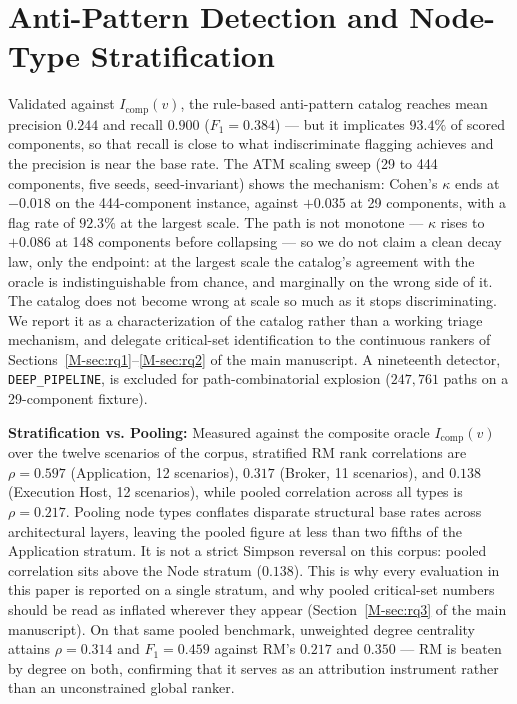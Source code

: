 \documentclass[preprint,3p]{elsarticle}
\begin{document}
\section{Anti-Pattern Detection and Node-Type Stratification}
\label{supp:detection}

Validated against $I_{\text{comp}}(v)$, the rule-based anti-pattern catalog reaches mean precision $0.244$ and recall $0.900$ ($F_1 = 0.384$) --- but it implicates $93.4\%$ of scored components, so that recall is close to what indiscriminate flagging achieves and the precision is near the base rate. The ATM scaling sweep (29 to 444 components, five seeds, seed-invariant) shows the mechanism: Cohen's $\kappa$ ends at $-0.018$ on the 444-component instance, against $+0.035$ at 29 components, with a flag rate of $92.3\%$ at the largest scale. The path is not monotone --- $\kappa$ rises to $+0.086$ at 148 components before collapsing --- so we do not claim a clean decay law, only the endpoint: at the largest scale the catalog's agreement with the oracle is indistinguishable from chance, and marginally on the wrong side of it. The catalog does not become wrong at scale so much as it stops discriminating. We report it as a characterization of the catalog rather than a working triage mechanism, and delegate critical-set identification to the continuous rankers of Sections~\ref{M-sec:rq1}--\ref{M-sec:rq2} of the main manuscript. A nineteenth detector, \texttt{DEEP\_PIPELINE}, is excluded for path-combinatorial explosion ($247{,}761$ paths on a 29-component fixture).

\noindent\textbf{Stratification vs. Pooling:} Measured against the composite oracle $I_{\text{comp}}(v)$ over the twelve scenarios of the corpus, stratified RM rank correlations are $\rho = 0.597$ (Application, 12 scenarios), $0.317$ (Broker, 11 scenarios), and $0.138$ (Execution Host, 12 scenarios), while pooled correlation across all types is $\rho = 0.217$. Pooling node types conflates disparate structural base rates across architectural layers, leaving the pooled figure at less than two fifths of the Application stratum. It is not a strict Simpson reversal on this corpus: pooled correlation sits above the Node stratum ($0.138$). This is why every evaluation in this paper is reported on a single stratum, and why pooled critical-set numbers should be read as inflated wherever they appear (Section~\ref{M-sec:rq3} of the main manuscript). On that same pooled benchmark, unweighted degree centrality attains $\rho = 0.314$ and $F_1 = 0.459$ against RM's $0.217$ and $0.350$ --- RM is beaten by degree on both, confirming that it serves as an attribution instrument rather than an unconstrained global ranker.
\end{document}
